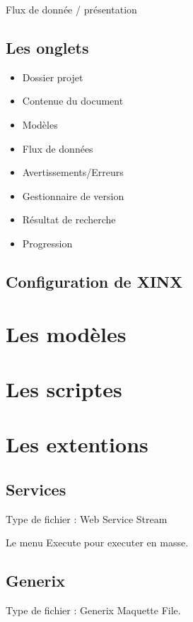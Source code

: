 \documentclass[a4paper,10pt,twoside]{book}
\begin{document}
Flux de donnée / présentation

\section{Les onglets}
\label{sec:dock}

\begin{itemize}
  \item Dossier projet
  \item Contenue du document
  \item Modèles
  \item Flux de données
  \item Avertissements/Erreurs
  \item Gestionnaire de version
  \item Résultat de recherche
  \item Progression
\end{itemize}

\section{Configuration de XINX}
\label{sec:Custom}

\chapter{Les modèles}
\label{sec:Snipets}

\chapter{Les scriptes}
\label{sec:Scripts}

\chapter{Les extentions}

\section{Services}
\label{sec:Services}


Type de fichier : Web Service Stream

Le menu Execute pour executer en masse.


\section{Generix}
\label{sec:Generix}

Type de fichier : Generix Maquette File.
\end{document}
